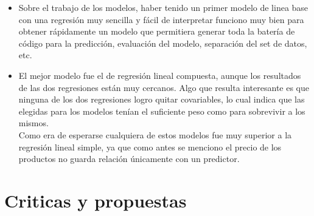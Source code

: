 \begin{itemize}
  \item Sobre el trabajo de los modelos, haber tenido un primer modelo de linea base con una regresión muy sencilla y fácil de interpretar funciono muy bien para obtener rápidamente un modelo que permitiera generar toda la batería de código para la predicción, evaluación del modelo, separación del set de datos, etc.
  \item El mejor modelo fue el de regresión lineal compuesta, aunque los resultados
  de las dos regresiones están muy cercanos. Algo que resulta interesante es que ninguna de los dos regresiones logro quitar covariables, lo cual indica que las elegidas para los modelos tenían el suficiente peso como para sobrevivir a los mismos.\\
  Como era de esperarse cualquiera de estos modelos fue muy superior a la regresión lineal simple, ya que como antes se menciono el precio de los productos no guarda relación únicamente con un predictor.

  
 

\end{itemize}


\section{Criticas y propuestas}

